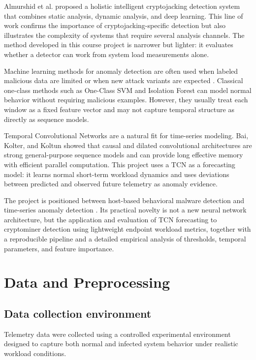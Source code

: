 \documentclass[a4paper,12pt]{extarticle}
\begin{document}
Almurshid et al. \cite{almurshid2024holistic} proposed a holistic intelligent cryptojacking detection system that combines static analysis, dynamic analysis, and deep learning. This line of work confirms the importance of cryptojacking-specific detection but also illustrates the complexity of systems that require several analysis channels. The method developed in this course project is narrower but lighter: it evaluates whether a detector can work from system load measurements alone.

Machine learning methods for anomaly detection are often used when labeled malicious data are limited or when new attack variants are expected \cite{redhu2024deep}. Classical one-class methods such as One-Class SVM and Isolation Forest can model normal behavior without requiring malicious examples. However, they usually treat each window as a fixed feature vector and may not capture temporal structure as directly as sequence models.

Temporal Convolutional Networks are a natural fit for time-series modeling. Bai, Kolter, and Koltun \cite{bai2018tcn} showed that causal and dilated convolutional architectures are strong general-purpose sequence models and can provide long effective memory with efficient parallel computation. This project uses a TCN as a forecasting model: it learns normal short-term workload dynamics and uses deviations between predicted and observed future telemetry as anomaly evidence.

The project is positioned between host-based behavioral malware detection and time-series anomaly detection \cite{darabian2020cryptomining,redhu2024deep}. Its practical novelty is not a new neural network architecture, but the application and evaluation of TCN forecasting \cite{bai2018tcn} to cryptominer detection using lightweight endpoint workload metrics, together with a reproducible pipeline and a detailed empirical analysis of thresholds, temporal parameters, and feature importance.

\newpage
\section{Data and Preprocessing}
\label{sec:data}

\subsection{Data collection environment}

Telemetry data were collected using a controlled experimental environment designed to capture both normal and infected system behavior under realistic workload conditions.
\end{document}
